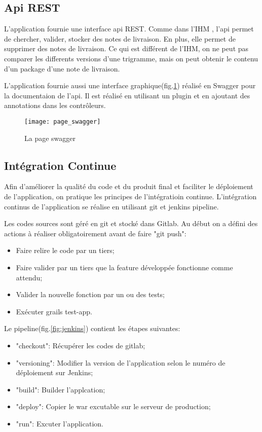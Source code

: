 \clearpage

\subsection{Api REST}
L'application fournie une interface api REST.
Comme dans l'IHM , l'api permet de chercher, valider, stocker des notes de livraison.
En plus, elle permet de supprimer des notes de livraison.
Ce qui est différent de l'IHM, on ne peut pas comparer les differents versions d'une trigramme, mais on peut obtenir le contenu d'un package d'une note de livraison.

L'application fournie aussi une interface graphique(fig.\ref{fig:page_swagger}) réalisé en Swagger pour la documentaion de l'api.
Il est réalisé en utilisant un plugin et en ajoutant des annotations dans les contrôleurs.

\begin{figure}[ht]
 \centering
 \texttt{[image: page\_swagger]}
 \caption{La page swagger}
 \label{fig:page_swagger}
\end{figure}

\clearpage

\subsection{Intégration Continue}
Afin d'améliorer la qualité du code et du produit final et faciliter le déploiement de l'application, on pratique les principes de l'intégratioin continue.
L'intégration continus de l'application se réalise en utilisant git et jenkins pipeline.

Les codes sources sont géré en git et stocké dans Gitlab.
Au début on a défini des actions à réaliser obligatoirement avant de faire "git push":
\begin{itemize}
 \item Faire relire le code par un tiers;
 \item Faire valider par un tiers que la feature développée fonctionne comme attendu;
 \item Valider la nouvelle fonction par un ou des tests;
 \item Exécuter grails test-app.
\end{itemize}

Le pipeline(fig.\ref{fig:jenkins}) contient les étapes suivantes:
\begin{itemize}
 \item "checkout": Récupérer les codes de gitlab;
 \item "versioning": Modifier la version de l'application selon le numéro de déploiement sur Jenkins;
 \item "build": Builder l'applcation;
 \item "deploy": Copier le war excutable sur le serveur de production;
 \item "run": Excuter l'application.
\end{itemize}

